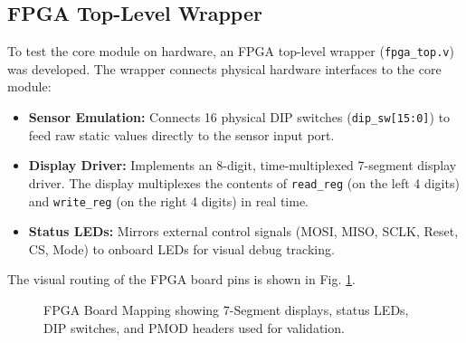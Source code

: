\documentclass[conference]{IEEEtran}
\begin{document}
\subsection{FPGA Top-Level Wrapper}
To test the core module on hardware, an FPGA top-level wrapper (\texttt{fpga\_top.v}) was developed. The wrapper connects physical hardware interfaces to the core module:
\begin{itemize}
    \item \textbf{Sensor Emulation:} Connects 16 physical DIP switches (\texttt{dip\_sw[15:0]}) to feed raw static values directly to the sensor input port.
    \item \textbf{Display Driver:} Implements an 8-digit, time-multiplexed 7-segment display driver. The display multiplexes the contents of \texttt{read\_reg} (on the left 4 digits) and \texttt{write\_reg} (on the right 4 digits) in real time.
    \item \textbf{Status LEDs:} Mirrors external control signals (MOSI, MISO, SCLK, Reset, CS, Mode) to onboard LEDs for visual debug tracking.
\end{itemize}

The visual routing of the FPGA board pins is shown in Fig. \ref{fig:fpga_pins}.

\begin{figure}[htbp]
\centering
{}
\caption{FPGA Board Mapping showing 7-Segment displays, status LEDs, DIP switches, and PMOD headers used for validation.}
\label{fig:fpga_pins}
\end{figure}
\end{document}
